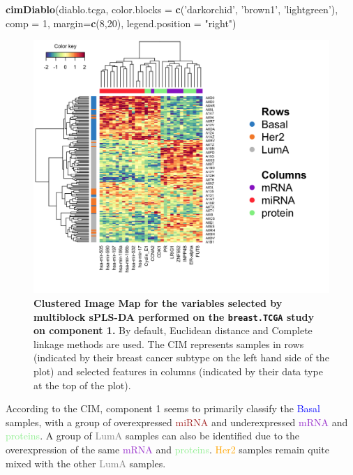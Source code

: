 \documentclass[]{book}
\newenvironment{Shaded}{\begin{snugshade}}{\end{snugshade}}
\newcommand{\DataTypeTok}[1]{\textcolor[rgb]{0.13,0.29,0.53}{#1}}
\newcommand{\DecValTok}[1]{\textcolor[rgb]{0.00,0.00,0.81}{#1}}
\newcommand{\KeywordTok}[1]{\textcolor[rgb]{0.13,0.29,0.53}{\textbf{#1}}}
\newcommand{\NormalTok}[1]{#1}
\newcommand{\StringTok}[1]{\textcolor[rgb]{0.31,0.60,0.02}{#1}}
\begin{document}
\begin{Shaded}
\begin{Highlighting}[]
\KeywordTok{cimDiablo}\NormalTok{(diablo.tcga, }\DataTypeTok{color.blocks =} \KeywordTok{c}\NormalTok{(}\StringTok{'darkorchid'}\NormalTok{, }\StringTok{'brown1'}\NormalTok{, }\StringTok{'lightgreen'}\NormalTok{),}
          \DataTypeTok{comp =} \DecValTok{1}\NormalTok{, }\DataTypeTok{margin=}\KeywordTok{c}\NormalTok{(}\DecValTok{8}\NormalTok{,}\DecValTok{20}\NormalTok{), }\DataTypeTok{legend.position =} \StringTok{"right"}\NormalTok{)}
\end{Highlighting}
\end{Shaded}

\begin{figure}

{\centering \includegraphics[width=0.7\linewidth]{Figures/DIABLO/diablo-cim-1} 

}

\caption{\textbf{Clustered Image Map for the variables selected by multiblock sPLS-DA performed on the \texttt{breast.TCGA} study on component 1.} By default, Euclidean distance and Complete linkage methods are used. The CIM represents samples in rows (indicated by their breast cancer subtype on the left hand side of the plot) and selected features in columns (indicated by their data type at the top of the plot).}\label{fig:diablo-cim}
\end{figure}



According to the CIM, component 1 seems to primarily classify the \textcolor{blue}{Basal} samples, with a group of overexpressed \textcolor{brown}{miRNA} and underexpressed \textcolor{darkorchid}{mRNA} and \textcolor{lightgreen}{proteins}. A group of \textcolor{grey}{LumA} samples can also be identified due to the overexpression of the same \textcolor{darkorchid}{mRNA} and \textcolor{lightgreen}{proteins}. \textcolor{orange}{Her2} samples remain quite mixed with the other \textcolor{grey}{LumA} samples.
\end{document}
